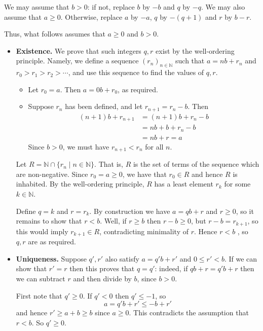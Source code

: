 \begin{cproof}
We may assume that $b>0$: if not, replace $b$ by $-b$ and $q$ by $-q$. We may also assume that $a \ge 0$. Otherwise, replace $a$ by $-a$, $q$ by $-(q+1)$ and $r$ by $b-r$.

Thus, what follows assumes that $a \ge 0$ and $b > 0$.

\begin{itemize}
\item \textbf{Existence.} We prove that such integers $q,r$ exist by the well-ordering principle. Namely, we define a sequence $(r_n)_{n \in \mathbb{N}}$ such that $a=nb+r_n$ and $r_0 > r_1 > r_2 > \cdots$, and use this sequence to find the values of $q,r$.

\begin{itemize}
\item Let $r_0=a$. Then $a=0b+r_0$, as required.
\item Suppose $r_n$ has been defined, and let $r_{n+1} = r_n-b$. Then
\begin{align*}
(n+1)b+r_{n+1} &= (n+1)b+r_n-b \\
&= nb + b + r_n - b \\
&= nb + r = a
\end{align*}
Since $b>0$, we must have $r_{n+1} < r_n$ for all $n$.
\end{itemize}

Let $R = \mathbb{N} \cap \{ r_n \mid n \in \mathbb{N} \}$. That is, $R$ is the set of terms of the sequence which are non-negative. Since $r_0 = a \ge 0$, we have that $r_0 \in R$ and hence $R$ is inhabited. By the well-ordering principle, $R$ has a least element $r_k$ for some $k \in \mathbb{N}$.

Define $q=k$ and $r=r_k$. By construction we have $a=qb+r$ and $r \ge 0$, so
it remains to show that $r < b$. Well, if $r \ge b$ then $r-b \ge 0$, but $r-b=r_{k+1}$, so this would imply $r_{k+1} \in R$, contradicting minimality of $r$. Hence $r < b$%
, so $q,r$ are as required.

\item \textbf{Uniqueness.} Suppose $q',r'$ also satisfy $a=q'b+r'$ and $0 \le r' < b$. If we can show that $r'=r$ then this proves that $q=q'$: indeed, if $qb+r=q'b+r$ then we can subtract $r$ and then divide by $b$, since $b>0$.

First note that $q' \ge 0$. If $q'<0$ then $q' \le -1$, so
\[ a = q'b+r' \le -b+r' \]
and hence $r' \ge a+b \ge b$ since $a \ge 0$. This contradicts the assumption that $r<b$. So $q' \ge 0$.


\end{itemize}
\end{cproof}
